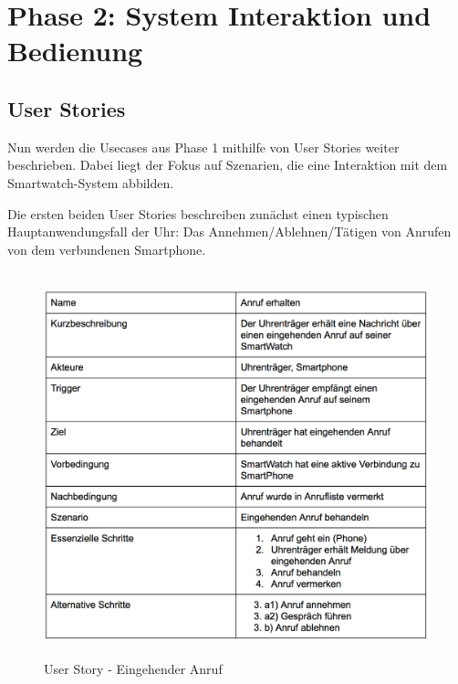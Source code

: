\chapter{Phase 2: System Interaktion und Bedienung}

\section{User Stories}

Nun werden die Usecases aus Phase 1 mithilfe von User Stories weiter beschrieben. Dabei liegt der Fokus auf Szenarien, die eine Interaktion mit dem Smartwatch-System abbilden.

Die ersten beiden User Stories beschreiben zunächst einen typischen Hauptanwendungsfall der Uhr: Das Annehmen/Ablehnen/Tätigen von Anrufen von dem verbundenen Smartphone.

\begin{figure}[H]
\centering\
\includegraphics[width=14cm]{img/story_in}
\caption{User Story - Eingehender Anruf}\label{fig:story-in}
\end{figure}

